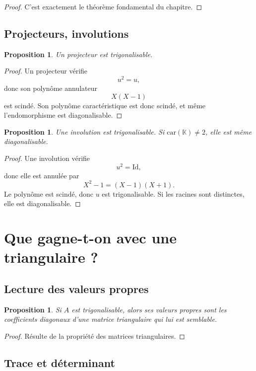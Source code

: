 \documentclass[11pt,a4paper]{article}
\newtheorem{proposition}[definition]{Proposition}
\theoremstyle{remark}
\newcommand{\K}{\mathbb{K}}
\newcommand{\id}{\mathrm{Id}}
\begin{document}
\begin{proof}
C’est exactement le théorème fondamental du chapitre.
\end{proof}

\subsection{Projecteurs, involutions}

\begin{proposition}
Un projecteur est trigonalisable.
\end{proposition}

\begin{proof}
Un projecteur vérifie
\[
u^2=u,
\]
donc son polynôme annulateur
\[
X(X-1)
\]
est scindé. Son polynôme caractéristique est donc scindé, et même l’endomorphisme est diagonalisable.
\end{proof}

\begin{proposition}
Une involution est trigonalisable. Si \(\mathrm{car}(\K)\neq 2\), elle est même diagonalisable.
\end{proposition}

\begin{proof}
Une involution vérifie
\[
u^2=\id,
\]
donc elle est annulée par
\[
X^2-1=(X-1)(X+1).
\]
Le polynôme est scindé, donc \(u\) est trigonalisable. Si les racines sont distinctes, elle est diagonalisable.
\end{proof}

\section{Que gagne-t-on avec une triangulaire ?}

\subsection{Lecture des valeurs propres}

\begin{proposition}
Si \(A\) est trigonalisable, alors ses valeurs propres sont les coefficients diagonaux d’une matrice triangulaire qui lui est semblable.
\end{proposition}

\begin{proof}
Résulte de la propriété des matrices triangulaires.
\end{proof}

\subsection{Trace et déterminant}
\end{document}
